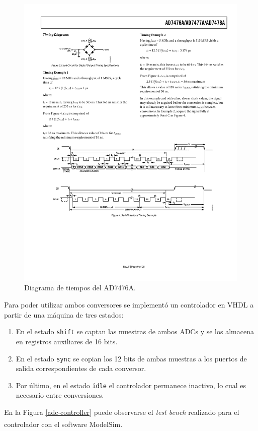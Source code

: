 \begin{figure}[hbt!]
    \centering
    \includegraphics[width=0.85\columnwidth]{Imágenes/Conversor analógico-digital/Diagrama de tiempos del AD7476A.pdf}
    \caption{Diagrama de tiempos del AD7476A.}
    \label{adc-timing}
\end{figure} 

Para poder utilizar ambos conversores se implementó un controlador en VHDL a partir de una máquina de tres estados:

\begin{enumerate}
    \item En el estado \texttt{shift} se captan las muestras de ambos ADCs y se los almacena en registros auxiliares de 16 bits.
    \item En el estado \texttt{sync} se copian los 12 bits de ambas muestras a los puertos de salida correspondientes de cada conversor.
    \item Por último, en el estado \texttt{idle} el controlador permanece inactivo, lo cual es necesario entre conversiones.
\end{enumerate}

En la Figura \ref{adc-controller} puede observarse el \emph{test bench} realizado para el controlador con el software ModelSim\textsuperscript\textregistered.

